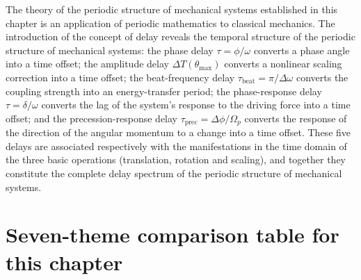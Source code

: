 \begin{remark}
The theory of the periodic structure of mechanical systems established in this chapter is an application of periodic mathematics to classical mechanics. The introduction of the concept of delay reveals the temporal structure of the periodic structure of mechanical systems: the phase delay $\tau = \phi/\omega$ converts a phase angle into a time offset; the amplitude delay $\Delta T(\theta_{\max})$ converts a nonlinear scaling correction into a time offset; the beat-frequency delay $\tau_{\text{beat}} = \pi/\Delta\omega$ converts the coupling strength into an energy-transfer period; the phase-response delay $\tau = \delta/\omega$ converts the lag of the system's response to the driving force into a time offset; and the precession-response delay $\tau_{\text{prec}} = \Delta\phi/\Omega_p$ converts the response of the direction of the angular momentum to a change into a time offset. These five delays are associated respectively with the manifestations in the time domain of the three basic operations (translation, rotation and scaling), and together they constitute the complete delay spectrum of the periodic structure of mechanical systems.
\end{remark}

\section*{Seven-theme comparison table for this chapter}

